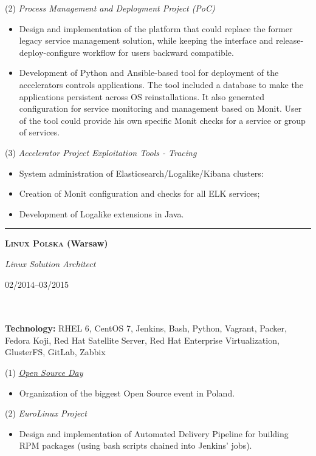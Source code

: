 \documentclass[$fontsize$, a4paper]{article}
\newcommand\textbox[1]{%
  \parbox{.333\textwidth}{#1}%
}
\begin{document}
(2) \emph{Process Management and Deployment Project (PoC)}
\begin{itemize}
  \item Design and implementation of the platform that could replace the former legacy service management solution,
  while keeping the interface and release-deploy-configure workflow for users backward compatible.
  \item Development of Python and Ansible-based tool for deployment of the accelerators controls applications. The tool included a database to make the applications persistent across OS reinstallations. It also generated configuration for service monitoring and management based on Monit. User of the tool could provide his own specific Monit checks for a service or group of services.
\end{itemize}

\vspace{5pt}
(3) \emph{Accelerator Project Exploitation Tools - Tracing}
\begin{itemize}
  \item System administration of Elasticsearch/Logalike/Kibana clusters:
  \item Creation of Monit configuration and checks for all ELK services;
  \item Development of Logalike extensions in Java.
\end{itemize}


\noindent\rule[0.5ex]{\linewidth}{1pt}

\noindent\textbox{\textbf{\textsc{Linux Polska} (Warsaw)}\hfill}\textbox{\hfil \emph{Linux Solution Architect}\hfil}\textbox{\hfill 02/2014--03/2015}\\\\
\textbf{Technology:} RHEL 6, CentOS 7, Jenkins, Bash, Python, Vagrant, Packer, Fedora Koji, Red Hat Satellite Server, Red Hat Enterprise Virtualization, GlusterFS, GitLab, Zabbix

\vspace{5pt}
(1) \emph{\href{http://opensourceday.com/}{Open Source Day}}
\begin{itemize}
  \item Organization of the biggest Open Source event in Poland.
\end{itemize}

(2) \emph{EuroLinux Project}
\begin{itemize}
  \item Design and implementation of Automated Delivery Pipeline for building RPM packages (using bash scripts chained into Jenkins' jobs).
\end{itemize}
\end{document}
